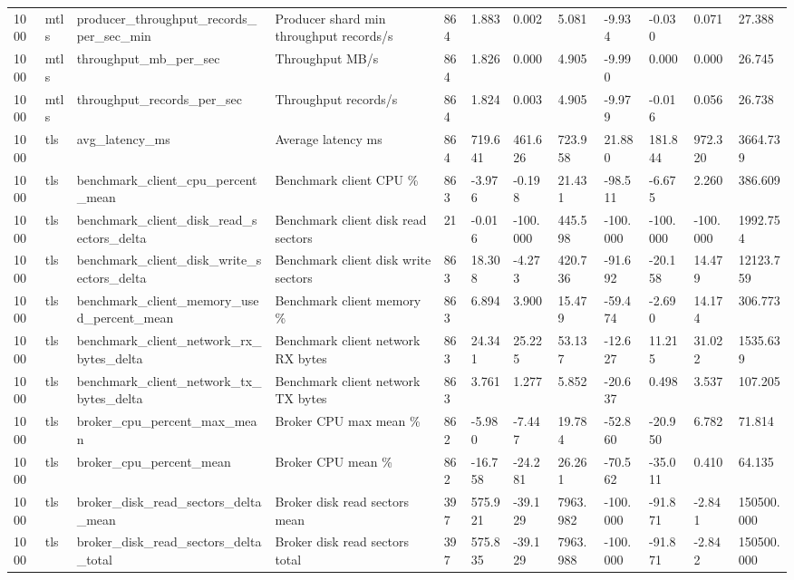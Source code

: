 \begin{longtable}{llllllllllll}
1000 & mtls & producer\_throughput\_records\_per\_sec\_min & Producer shard min throughput records/s & 864 & 1.883 & 0.002 & 5.081 & -9.934 & -0.030 & 0.071 & 27.388 \\
1000 & mtls & throughput\_mb\_per\_sec & Throughput MB/s & 864 & 1.826 & 0.000 & 4.905 & -9.990 & 0.000 & 0.000 & 26.745 \\
1000 & mtls & throughput\_records\_per\_sec & Throughput records/s & 864 & 1.824 & 0.003 & 4.905 & -9.979 & -0.016 & 0.056 & 26.738 \\
1000 & tls & avg\_latency\_ms & Average latency ms & 864 & 719.641 & 461.626 & 723.958 & 21.880 & 181.844 & 972.320 & 3664.739 \\
1000 & tls & benchmark\_client\_cpu\_percent\_mean & Benchmark client CPU \% & 863 & -3.976 & -0.198 & 21.431 & -98.511 & -6.675 & 2.260 & 386.609 \\
1000 & tls & benchmark\_client\_disk\_read\_sectors\_delta & Benchmark client disk read sectors & 21 & -0.016 & -100.000 & 445.598 & -100.000 & -100.000 & -100.000 & 1992.754 \\
1000 & tls & benchmark\_client\_disk\_write\_sectors\_delta & Benchmark client disk write sectors & 863 & 18.308 & -4.273 & 420.736 & -91.692 & -20.158 & 14.479 & 12123.759 \\
1000 & tls & benchmark\_client\_memory\_used\_percent\_mean & Benchmark client memory \% & 863 & 6.894 & 3.900 & 15.479 & -59.474 & -2.690 & 14.174 & 306.773 \\
1000 & tls & benchmark\_client\_network\_rx\_bytes\_delta & Benchmark client network RX bytes & 863 & 24.341 & 25.225 & 53.137 & -12.627 & 11.215 & 31.022 & 1535.639 \\
1000 & tls & benchmark\_client\_network\_tx\_bytes\_delta & Benchmark client network TX bytes & 863 & 3.761 & 1.277 & 5.852 & -20.637 & 0.498 & 3.537 & 107.205 \\
1000 & tls & broker\_cpu\_percent\_max\_mean & Broker CPU max mean \% & 862 & -5.980 & -7.447 & 19.784 & -52.860 & -20.950 & 6.782 & 71.814 \\
1000 & tls & broker\_cpu\_percent\_mean & Broker CPU mean \% & 862 & -16.758 & -24.281 & 26.261 & -70.562 & -35.011 & 0.410 & 64.135 \\
1000 & tls & broker\_disk\_read\_sectors\_delta\_mean & Broker disk read sectors mean & 397 & 575.921 & -39.129 & 7963.982 & -100.000 & -91.871 & -2.841 & 150500.000 \\
1000 & tls & broker\_disk\_read\_sectors\_delta\_total & Broker disk read sectors total & 397 & 575.835 & -39.129 & 7963.988 & -100.000 & -91.871 & -2.842 & 150500.000 \\

\end{longtable}

